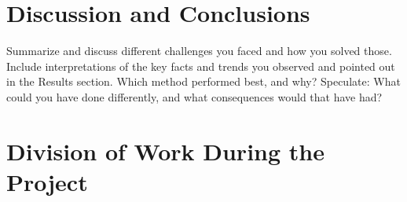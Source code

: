 \documentclass[sigconf]{acmart}
\begin{document}
\section{Discussion and Conclusions}

Summarize and discuss different challenges you faced and how you solved those. Include interpretations of the key facts and trends you observed and pointed out in the Results section. Which method performed best, and why? Speculate: What could you have done differently, and what consequences would that have had?







\newpage
\appendix
\section{Division of Work During the Project}
\end{document}
